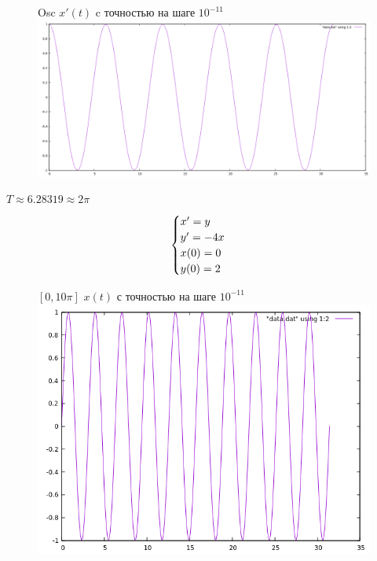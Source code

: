 \documentclass[12pt, a4paper] {report}
\theoremstyle{remark}
\theoremstyle{definition}
\begin{document}
\begin{figure}[h!]
 Osc $x'(t)$ c точностью на шаге $10^{-11}$\\
\centering
\includegraphics[width=1\linewidth]{010pi13.png} 
\end{figure}
$T \approx 6.28319 \approx 2\pi$\\
\newpage
\begin{gather}
\begin{cases}
\notag x' = y \\
\notag y' = -4x \\
\notag x(0) = 0 \\
\notag y(0) = 2
\end{cases}
\end{gather}
\begin{figure}[H]
$[0,10\pi]$ $x(t)$ с точностью на шаге $10^{-11}$  \\
\centering
\includegraphics[width=1\linewidth]{010pi124.png} 
\end{figure}
\newpage
\end{document}
